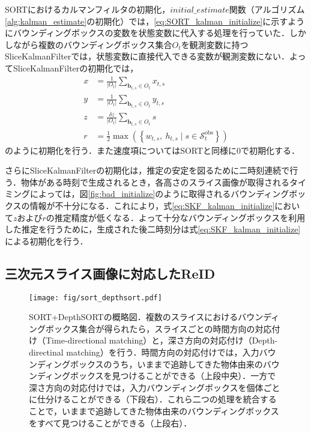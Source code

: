             SORTにおけるカルマンフィルタの初期化，$initial\_estimate$関数（アルゴリズム\ref{alg:kalman_estimate}の初期化）では，\ref{eq:SORT_kalman_initialize}に示すようにバウンディングボックスの変数を状態変数に代入する処理を行っていた．しかしながら複数のバウンディングボックス集合$O_t$を観測変数に持つSliceKalmanFilterでは，状態変数に直接代入できる変数が観測変数にない．よってSliceKalmanFilterの初期化では，
            \begin{equation}
                \label{eq:SKF_kalman_initialize}
                \begin{aligned}
                    x &= \frac{1}{\left|O_t\right|} \sum_{\bm{b}_{t,s} \in O_t} x_{t,s}
                    \\ y &= \frac{1}{\left|O_t\right|} \sum_{\bm{b}_{t,s} \in O_t} y_{t,s}
                    \\ z &= \frac{\delta z}{\left|O_t\right|} \sum_{\bm{b}_{t,s} \in O_t} s 
                    \\ r &= \frac{1}{2} \max \left(\left\{w_{t,s}, ~ h_{t,s} \mid s \in \mathcal{S}_t^{\text{obs}}\right\}\right)
                \end{aligned}
            \end{equation}
            のように初期化を行う．また速度項についてはSORTと同様に$0$で初期化する．

            さらにSliceKalmanFilterの初期化は，推定の安定を図るために二時刻連続で行う．物体がある時刻で生成されるとき，各高さのスライス画像が取得されるタイミングによっては，図\ref{fig:bad_initialize}のように取得されるバウンディングボックスの情報が不十分になる．これにより，式\ref{eq:SKF_kalman_initialize}において$z$および$r$の推定精度が低くなる．よって十分なバウンディングボックスを利用した推定を行うために，生成された後二時刻分は式\ref{eq:SKF_kalman_initialize}による初期化を行う．

    \subsection{三次元スライス画像に対応したReID}
    \label{subsec:re-identificataion_for_slice}

    \begin{figure}[t]
        \centering
        \texttt{[image: fig/sort\_depthsort.pdf]}
        \caption[SORT+DepthSORTの概略図]{SORT+DepthSORTの概略図．複数のスライスにおけるバウンディングボックス集合が得られたら，スライスごとの時間方向の対応付け（Time-directional matching）と，深さ方向の対応付け（Depth-directinal matching）を行う．時間方向の対応付けでは，入力バウンディングボックスのうち，いままで追跡してきた物体由来のバウンディングボックスを見つけることができる（上段中央）．一方で深さ方向の対応付けでは，入力バウンディングボックスを個体ごとに仕分けることができる（下段右）．これら二つの処理を統合することで，いままで追跡してきた物体由来のバウンディングボックスをすべて見つけることができる（上段右）．}
        \label{fig:sort_depthsort}
    \end{figure}

